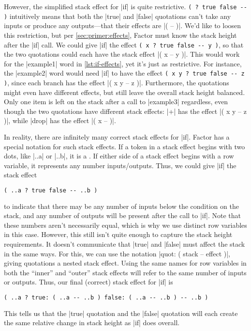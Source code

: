 
However, the simplified stack effect for \factor|if| is quite restrictive.
%
\Verb|( ? true false -- )| 
%
intuitively means that both the \factor|true| and \factor|false| quotations
can't take any inputs or produce any outputs---that their effects are
%
\factor|( -- )|.
%
We'd like to loosen this restriction, but per \cref{sec:primer:effects}, Factor
must know the stack height after the \factor|if| call.  We could give
\factor|if| the effect
%
\Verb|( x ? true false -- y )|,
%
so that the two quotations could each have the stack effect
%
\factor|( x -- y )|.
%
This would work for the \factor|example1| word in \vref{lst:if-effects}, yet
it's just as restrictive.  For instance, the \factor|example2| word would need
\factor|if| to have the effect
%
\Verb|( x y ? true false -- z )|,
%
since each branch has the effect
%
\factor|( x y -- z )|.
%
Furthermore, the quotations might even have different effects, but still leave
the overall stack height balanced.  Only one item is left on the stack after a
call to \factor|example3| regardless, even though the two quotations have
different stack effects: \factor|+| has the effect
%
\factor|( x y -- z )|,
%
while \factor|drop| has the effect
%
\factor|( x -- )|.

In reality, there are infinitely many correct stack effects for \factor|if|.
Factor has a special notation for such  stack effects.
If a token in a stack effect begins with two dots, like \factor|..a| or
\factor|..b|, it is a .  If either side of a stack effect
begins with a row variable, it represents any number inputs/outputs.  Thus, we
could give \factor|if| the stack effect
%
\begin{center} \Verb|( ..a ? true false -- ..b )| \end{center}
%
\noindent to indicate that there may be any number of inputs below the
condition on the stack, and any number of outputs will be present after the
call to \factor|if|.  Note that these numbers aren't necessarily equal, which
is why we use distinct row variables in this case.  However, this still isn't
quite enough to capture the stack height requirements.  It doesn't communicate
that \factor|true| and \factor|false| must affect the stack in the same ways.
For this, we can use the notation
%
\factor|quot: ( stack -- effect )|,
%
giving quotations a nested stack effect.  Using the same names for row
variables in both the ``inner'' and ``outer'' stack effects will refer to the
same number of inputs or outputs.  Thus, our final (correct) stack effect for
\factor|if| is 
%
\begin{center}
%
  \Verb|( ..a ? true: ( ..a -- ..b ) false: ( ..a -- ..b ) -- ..b )|
%
\end{center}
%
\noindent This tells us that the \factor|true| quotation and the \factor|false|
quotation will each create the same relative change in stack height as
\factor|if| does overall.

